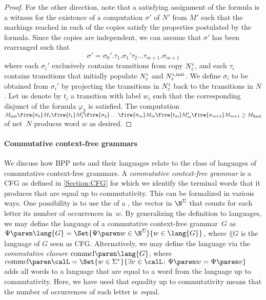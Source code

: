 \documentclass[../../diss.tex]{subfiles}
\begin{document}
\begin{proof}
    For the other direction, note that a satisfying assignment of the formula is a witness for the existence of a computation $\sigma'$ of $N'$ from $M'$ such that the markings reached in each of the copies satisfy the properties postulated by the formula.
    Since the copies are independent, we can \wolog assume that $\sigma'$ has been rearranged such that
    \[
        \sigma' = \sigma_0'.\tau_1.\sigma_1'\tau_2 \ldots \tau_{m+1}.\sigma_{m+1}
    \]
    where each $\sigma_i'$ exclusively contains transitions from copy $N_\varepsilon^i$, and each $\tau_i$ contains transitions that initially populate $N_\varepsilon^i$ and $N_\varepsilon^{i,{\text{init}}}$.
    We define $\sigma_i$ to be obtained from $\sigma_i'$ by projecting the transitions in $N_\varepsilon^i$ back to the transitions in $N$.
    Let us denote by $t_i$ a transition with label $w_i$ such that the corresponding disjunct of the formula $\varphi_2$ is satisfied.
    The computation
    \(
        \Minit \fire{\sigma_0} M_1 \fire{t_1} M_1' \fire{\sigma_2} \ldots \fire{\sigma_m} M_m \fire{t_m} M_m' \fire{\sigma_{m+1}} M_{m+1} \geq \Mfinal
    \)
    of net~$N$ produces word $w$ as desired.
\end{proof}

\paragraph{Commutative context-free grammars}

We discuss how BPP nets and their languages relate to the class of languages of commutative context-free grammars.
A \emph{commutative context-free grammar} is a CFG as defined in \cref{Section:CFG} for which we identify the terminal words that it produces that are equal up to commutativity.
This can be formalized in various ways.
One possibility is to use the  of a , the vector in $\N^\Sigma$ that counts for each letter its number of occurrences in~$w$.
By generalizing the definition to languages, we may define the language of a commutative context-free grammar~$G$ as $\Parikh{\lang{G}} = \Set{ \Parikh{w} \in \N^\Sigma}{ w \in \lang{G}}$, where $\lang{G}$ is the language of $G$ seen as CFG.\@
Alternatively, we may define the language via the \emph{commutative closure} $\commclosure{\lang{G}}$, where $\commclosure{\calL} = \Set{ w \in \Sigma^*}{ \exists v \in \calL \colon \Parikh{w} = \Parikh{v}}$ adds all words to a language that are equal to a word from the language up to commutativity.
Here, we have used that equality up to commutativity means that the number of occurrences of each letter is~equal.
\end{document}
